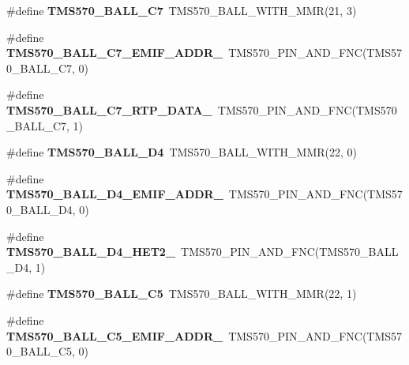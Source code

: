 \begin{DoxyCompactItemize}
\#define {\bfseries T\+M\+S570\+\_\+\+B\+A\+L\+L\+\_\+\+C7}~T\+M\+S570\+\_\+\+B\+A\+L\+L\+\_\+\+W\+I\+T\+H\+\_\+\+M\+MR(21, 3)
\item 
\mbox{\label{tms570ls3137zwt-pins_8h_a3c7821f5f1aa2c7ec0bb2c2c62a83998}} 
\#define {\bfseries T\+M\+S570\+\_\+\+B\+A\+L\+L\+\_\+\+C7\+\_\+\+E\+M\+I\+F\+\_\+\+A\+D\+D\+R\+\_}~T\+M\+S570\+\_\+\+P\+I\+N\+\_\+\+A\+N\+D\+\_\+\+F\+NC(T\+M\+S570\+\_\+\+B\+A\+L\+L\+\_\+\+C7, 0)
\item 
\mbox{\label{tms570ls3137zwt-pins_8h_a168fb63cf511f04c27ad2e13e8cd83b6}} 
\#define {\bfseries T\+M\+S570\+\_\+\+B\+A\+L\+L\+\_\+\+C7\+\_\+\+R\+T\+P\+\_\+\+D\+A\+T\+A\+\_}~T\+M\+S570\+\_\+\+P\+I\+N\+\_\+\+A\+N\+D\+\_\+\+F\+NC(T\+M\+S570\+\_\+\+B\+A\+L\+L\+\_\+\+C7, 1)
\item 
\mbox{\label{tms570ls3137zwt-pins_8h_a20a73c4871f33b38f74f0bbb3449eb2e}} 
\#define {\bfseries T\+M\+S570\+\_\+\+B\+A\+L\+L\+\_\+\+D4}~T\+M\+S570\+\_\+\+B\+A\+L\+L\+\_\+\+W\+I\+T\+H\+\_\+\+M\+MR(22, 0)
\item 
\mbox{\label{tms570ls3137zwt-pins_8h_ae5335fbfd9475247ee2cef6d9be4037b}} 
\#define {\bfseries T\+M\+S570\+\_\+\+B\+A\+L\+L\+\_\+\+D4\+\_\+\+E\+M\+I\+F\+\_\+\+A\+D\+D\+R\+\_}~T\+M\+S570\+\_\+\+P\+I\+N\+\_\+\+A\+N\+D\+\_\+\+F\+NC(T\+M\+S570\+\_\+\+B\+A\+L\+L\+\_\+\+D4, 0)
\item 
\mbox{\label{tms570ls3137zwt-pins_8h_abc528a1d4f8c528e41e25d0f422d0a8e}} 
\#define {\bfseries T\+M\+S570\+\_\+\+B\+A\+L\+L\+\_\+\+D4\+\_\+\+H\+E\+T2\+\_}~T\+M\+S570\+\_\+\+P\+I\+N\+\_\+\+A\+N\+D\+\_\+\+F\+NC(T\+M\+S570\+\_\+\+B\+A\+L\+L\+\_\+\+D4, 1)
\item 
\mbox{\label{tms570ls3137zwt-pins_8h_a68cd49c5fae726ad359edde2b38d04a6}} 
\#define {\bfseries T\+M\+S570\+\_\+\+B\+A\+L\+L\+\_\+\+C5}~T\+M\+S570\+\_\+\+B\+A\+L\+L\+\_\+\+W\+I\+T\+H\+\_\+\+M\+MR(22, 1)
\item 
\mbox{\label{tms570ls3137zwt-pins_8h_a96365582541f2336850da6592f920944}} 
\#define {\bfseries T\+M\+S570\+\_\+\+B\+A\+L\+L\+\_\+\+C5\+\_\+\+E\+M\+I\+F\+\_\+\+A\+D\+D\+R\+\_}~T\+M\+S570\+\_\+\+P\+I\+N\+\_\+\+A\+N\+D\+\_\+\+F\+NC(T\+M\+S570\+\_\+\+B\+A\+L\+L\+\_\+\+C5, 0)

\end{DoxyCompactItemize}
